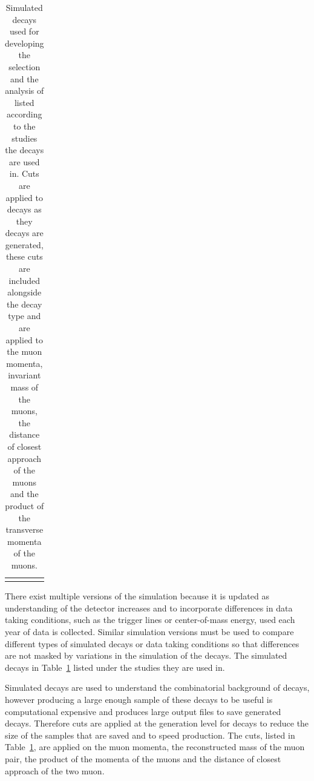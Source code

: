 \begin{table}[htbp]
\begin{center}
\begin{tabular}{p{}p{}p{}p{}}
{{\end{tabular}
\vspace{0.7cm}
\caption{Simulated decays used for developing the selection and the analysis of \bsmumu listed according to the studies the decays are used in. Cuts are applied to \bbbarmumux decays as they decays are generated, these cuts are included alongside the decay type and are applied to the muon momenta, invariant mass of the muons, the distance of closest approach of the muons and the product of the transverse momenta of the muons.}
\label{tab:MC_decays}
\end{center}
\vspace{-1.0cm}
\end{table}

There exist multiple versions of the simulation because it is updated as understanding of the detector increases and to incorporate differences in data taking conditions, such as the trigger lines or center-of-mass energy, used each year of data is collected. Similar simulation versions must be used to compare different types of simulated decays or data taking conditions so that differences are not masked by variations in the simulation of the decays. The simulated decays in Table~\ref{tab:MC_decays} listed under the studies they are used in. 

Simulated \bbbarmumux decays are used to understand the combinatorial background of \bmumu decays, however producing a large enough sample of these decays to be useful is computational expensive and produces large output files to save generated decays. Therefore cuts are applied at the generation level for \bbbarmumux decays to reduce the size of the samples that are saved and to speed production. The cuts, listed in Table~\ref{tab:MC_decays}, are applied on the muon momenta, the reconstructed mass of the muon pair, the product of the momenta of the muons and the distance of closest approach of the two muon. %
  

